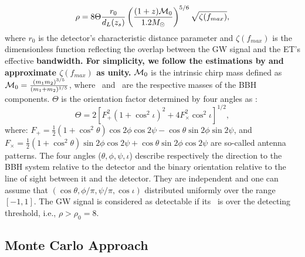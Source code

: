 \documentclass[twocolumn]{aastex62}
\begin{document}
\begin{equation} \label{SNR}
\rho = 8 \Theta \frac{r_0}{d_L(z_s)} \left( \frac{(1+z){\cal M}_0}{1.2 M_{\odot}} \right)^{5/6}
\sqrt {\zeta(f_{max})},
\end{equation}
where $r_0$ is the detector's characteristic distance parameter and $\zeta(f_{max})$ is the dimensionless function reflecting the overlap between the GW signal and the ET's effective {\bf bandwidth. For simplicity, we follow the estimations by \citet{Taylor2012} and approximate $\zeta(f_{max})$ as  unity.} ${\cal M}_0$ is the intrinsic chirp mass defined as $ {\cal M}_0 = \frac{(m_1m_2)^{3/5}}{(m_1+m_2)^{1/5}}$, where \mone\ and \mtwo\ are the
respective masses of the BBH components. $\Theta$ is the orientation factor determined by four angles as \citep{Finn93}:
 \begin{equation} \label{Theta}
 \Theta = 2 [ F_{+}^2(1 + \cos^2{\iota} )^2 + 4 F_{\times}^2 \cos^2{\iota} ]^{1/2},
 \end{equation}
where: $F_{+} = \frac{1}{2} (1 + \cos^2{\theta}) \cos{2\phi} \cos{2 \psi} - \cos{\theta} \sin{2 \phi} \sin{ 2 \psi}$, and
$F_{\times} = \frac{1}{2} (1 + \cos^2{\theta}) \sin{2\phi} \cos{2 \psi} + \cos{\theta} \sin{2 \phi} \cos{ 2 \psi}$ are so-called antenna patterns. The four angles ($\theta, \phi, \psi, \iota$) describe respectively the
direction to the BBH system relative to the detector and the binary orientation relative to the line of sight between it and the detector. 
They are independent and one can assume that $(\cos\theta, \phi/\pi, \psi/\pi, \cos\iota)$ distributed uniformly over the range $[-1, 1]$. The GW signal is considered as detectable if its \snr\ is over the detecting threshold, i.e., $\rho > \rho_0 = 8$.

\subsection{Monte Carlo Approach} \label{MC}
\end{document}
